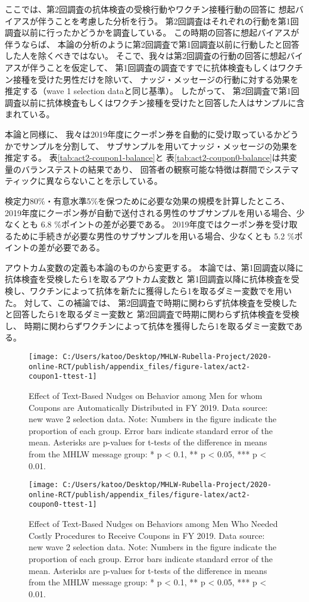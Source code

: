 \documentclass[
  11pt,
  a4paper,
]{article}
\begin{document}
ここでは、第2回調査の抗体検査の受検行動やワクチン接種行動の回答に
想起バイアスが伴うことを考慮した分析を行う。
第2回調査はそれぞれの行動を第1回調査以前に行ったかどうかを調査している。
この時期の回答に想起バイアスが伴うならば、
本論の分析のように第2回調査で第1回調査以前に行動したと回答した人を除くべきではない。
そこで、我々は第2回調査の行動の回答に想起バイアスが伴うことを仮定して、
第1回調査の調査ですでに抗体検査もしくはワクチン接種を受けた男性だけを除いて、
ナッジ・メッセージの行動に対する効果を推定する（wave 1 selection dataと同じ基準）。
したがって、
第2回調査で第1回調査以前に抗体検査もしくはワクチン接種を受けたと回答した人はサンプルに含まれている。

本論と同様に、
我々は2019年度にクーポン券を自動的に受け取っているかどうかでサンプルを分割して、
サブサンプルを用いてナッジ・メッセージの効果を推定する。
表\ref{tab:act2-coupon1-balance}と
表\ref{tab:act2-coupon0-balance}は共変量のバランステストの結果であり、
回答者の観察可能な特徴は群間でシステマティックに異ならないことを示している。

検定力80\%・有意水準5\%を保つために必要な効果の規模を計算したところ、
2019年度にクーポン券が自動で送付される男性のサブサンプルを用いる場合、少なくとも
6.8
\%ポイントの差が必要である。
2019年度ではクーポン券を受け取るために手続きが必要な男性のサブサンプルを用いる場合、少なくとも
5.2
\%ポイントの差が必要である。

アウトカム変数の定義も本論のものから変更する。
本論では、第1回調査以降に抗体検査を受検したら1を取るアウトカム変数と
第1回調査以降に抗体検査を受検し、ワクチンによって抗体を新たに獲得したら1を取るダミー変数でを用いた。
対して、この補論では、
第2回調査で時期に関わらず抗体検査を受検したと回答したら1を取るダミー変数と
第2回調査で時期に関わらず抗体検査を受検し、
時期に関わらずワクチンによって抗体を獲得したら1を取るダミー変数である。

\begin{figure}[t]
\texttt{[image: C:/Users/katoo/Desktop/MHLW-Rubella-Project/2020-online-RCT/publish/appendix\_files/figure-latex/act2-coupon1-ttest-1]} \caption{Effect of Text-Based Nudges on Behavior among Men for whom Coupons are Automatically Distributed in FY 2019. Data source: new wave 2 selection data. Note: Numbers in the figure indicate the proportion of each group. Error bars indicate standard error of the mean. Asterisks are p-values for t-tests of the difference in means from the MHLW message group: * p < 0.1, ** p < 0.05, *** p < 0.01.}\label{fig:act2-coupon1-ttest}
\end{figure}
\begin{figure}[t]
\texttt{[image: C:/Users/katoo/Desktop/MHLW-Rubella-Project/2020-online-RCT/publish/appendix\_files/figure-latex/act2-coupon0-ttest-1]} \caption{Effect of Text-Based Nudges on Behaviors among Men Who Needed Costly Procedures to Receive Coupons in FY 2019. Data source: new wave 2 selection data. Note: Numbers in the figure indicate the proportion of each group. Error bars indicate standard error of the mean. Asterisks are p-values for t-tests of the difference in means from the MHLW message group: * p < 0.1, ** p < 0.05, *** p < 0.01.}\label{fig:act2-coupon0-ttest}
\end{figure}
\end{document}
